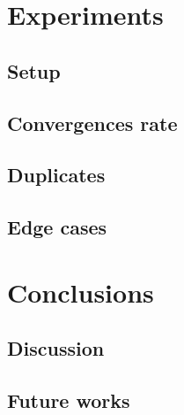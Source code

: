 \documentclass[mscthesis]{usiinfthesis}
\begin{document}
\chapter{Experiments}
\section{Setup}
\section{Convergences rate}
\section{Duplicates}
\section{Edge cases}

\chapter{Conclusions}
\section{Discussion}
\section{Future works}


%
%
%
%
%
%

%
%



\lipsum
\end{document}
